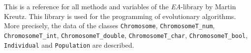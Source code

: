 This is a reference for all methods and variables
of the {\em EA}-library by Martin Kreutz. This library is
used for the programming of evolutionary algorithms.
More precisely, the data of the classes
{\tt Chromosome}, {\tt ChromosomeT\_num}, {\tt ChromosomeT\_int},
{\tt ChromosomeT\_double}, {\tt ChromosomeT\_char}, 
{\tt Chro\-mo\-someT\_bool}, {\tt Individual} and {\tt Po\-pu\-la\-tion} 
are described.

